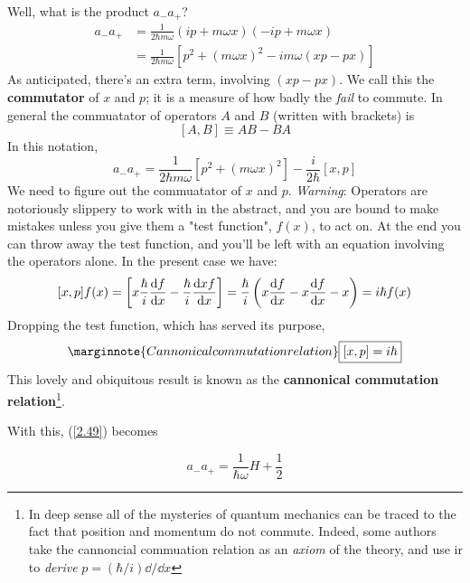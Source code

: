 Well, what is the product $a_-a_+$?
\begin{align*}
	a_-a_+&=\frac{1}{2\hbar m\omega}(ip+m\omega x)(-ip+m\omega x)\\
				&=\frac{1}{2\hbar m\omega}[p^2+(m\omega x)^2-im\omega(xp-px)]
\end{align*}
As anticipated, there's an extra term, involving $(xp-px)$. We call this the \textbf{commutator} of $x$ and $p$; it is a measure of how badly the \textit{fail} to commute. In general the commuatator of operators $A$ and $B$ (written with brackets) is
\begin{equation}\label{2.48}
	[A,B]\equiv AB-BA
\end{equation}
In this notation,
\begin{equation}\label{2.49}
	a_-a_+=\frac{1}{2\hbar m\omega}[p^2+(m\omega x)^2]-\frac{i}{2\hbar}[x,p]
\end{equation}
We need to figure out the commuatator of $x$ and $p$. \textit{Warning}: Operators are notoriously slippery to work with in the abstract, and you are bound to make mistakes unless you give them a "test function", $f(x)$, to act on. At the end you can throw away the test function, and you'll be left with an equation involving the operators alone. In the present case we have:
\begin{equation}\label{2.50}
	[x,p]f(x)=\left[x\frac{\hbar}{i}\dv{f}{x}-\frac{\hbar}{i}\dv{xf}{x}\right]=\frac{\hbar}{i}\left(x\dv{f}{x}-x\dv{f}{x}-x\right)=i\hbar f(x)
\end{equation}
Dropping the test function, which has served its purpose,
\begin{equation}\label{2.51}\marginnote{Cannonical commutation relation}
	\boxed{[x,p]=i\hbar}
\end{equation}
This lovely and obiquitous result is known as the \textbf{cannonical commutation relation}\footnote{In deep sense all of the mysteries of quantum mechanics can be traced to the fact that position and momentum do not commute. Indeed, some authors take the cannoncial commuation relation as an \textit{axiom} of the theory, and use ir to \textit{derive} $p=(\hbar/i)\dd/\dd x$}.

With this, (\ref{2.49}) becomes

\begin{equation}\label{2.52}
	a_-a_+=\frac{1}{\hbar\omega}H+\frac{1}{2}
\end{equation}
























